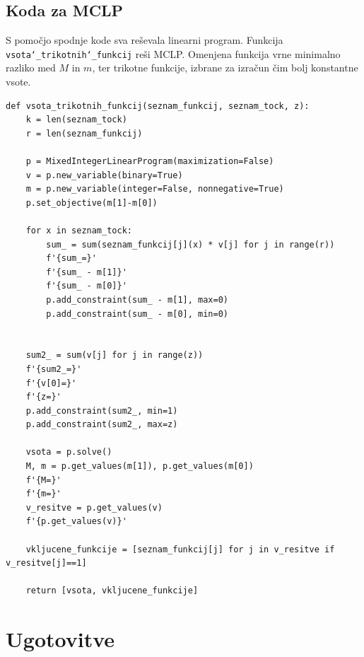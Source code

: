 \documentclass[11pt]{article}
\theoremstyle{definition}
\newcommand{\1}{\mathbbm{1}}
\begin{document}
\subsection{Koda za MCLP}
\vspace{0.5cm}

S pomočjo spodnje kode sva reševala linearni program. 
Funkcija \texttt{vsota\char`_trikotnih\char`_funkcij} reši MCLP. Omenjena funkcija vrne minimalno razliko med $M$ in $m$, ter trikotne funkcije, izbrane za izračun čim bolj konstantne vsote.

\begin{verbatim}
def vsota_trikotnih_funkcij(seznam_funkcij, seznam_tock, z):
    k = len(seznam_tock)
    r = len(seznam_funkcij)

    p = MixedIntegerLinearProgram(maximization=False)
    v = p.new_variable(binary=True)
    m = p.new_variable(integer=False, nonnegative=True)
    p.set_objective(m[1]-m[0])

    for x in seznam_tock:
        sum_ = sum(seznam_funkcij[j](x) * v[j] for j in range(r))
        f'{sum_=}'
        f'{sum_ - m[1]}'
        f'{sum_ - m[0]}'
        p.add_constraint(sum_ - m[1], max=0)
        p.add_constraint(sum_ - m[0], min=0)


    sum2_ = sum(v[j] for j in range(z))
    f'{sum2_=}'
    f'{v[0]=}'
    f'{z=}'
    p.add_constraint(sum2_, min=1)
    p.add_constraint(sum2_, max=z)

    vsota = p.solve()
    M, m = p.get_values(m[1]), p.get_values(m[0])
    f'{M=}'
    f'{m=}'
    v_resitve = p.get_values(v)
    f'{p.get_values(v)}'

    vkljucene_funkcije = [seznam_funkcij[j] for j in v_resitve if v_resitve[j]==1]

    return [vsota, vkljucene_funkcije]
\end{verbatim}



\section{Ugotovitve}
\vspace{0.5cm}

\end{document}
